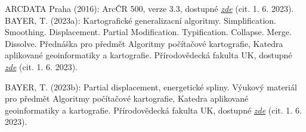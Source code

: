 \begin{thebibliography}{9}

ARCDATA Praha (2016): ArcČR 500, verze 3.3, dostupné \href{https://download.arcdata.cz/data/ArcCR_500-3.3-Popis-dat.pdf}{\emph{zde}} (cit. 1. 6. 2023).
BAYER, T. (2023a): Kartografické generalizacní algoritmy. Simplification. Smoothing. Displacement. Partial Modification. Typification. Collapse. Merge. Dissolve. Přednáška pro předmět Algoritmy počítačové kartografie, Katedra aplikované geoinformatiky a kartografie. Přírodovědecká fakulta UK, dostupné \href{http://web.natur.cuni.cz/~bayertom/images/courses/Adk/adk8_new.pdf}{\emph{zde}} (cit. 1. 6. 2023).

BAYER, T. (2023b): Partial displacement, energetické spliny. Výukový materiál pro předmět Algoritmy počítačové kartografie, Katedra aplikované geoinformatiky a kartografie. Přírodovědecká fakulta UK, dostupné \href{http://web.natur.cuni.cz/~bayertom/images/courses/Adk/adk_ems.pdf}{\emph{zde}} (cit. 1. 6. 2023).

\end{thebibliography}